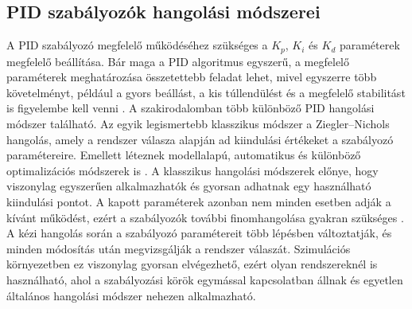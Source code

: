\documentclass[12pt,a4paper]{report}
\begin{document}
	\subsection{PID szabályozók hangolási módszerei}
	A PID szabályozó megfelelő működéséhez szükséges a $K_p$, $K_i$ és $K_d$ paraméterek megfelelő beállítása. Bár maga a PID algoritmus egyszerű, a megfelelő paraméterek meghatározása összetettebb feladat lehet, mivel egyszerre több követelményt, például a gyors beállást, a kis túllendülést és a megfelelő stabilitást is figyelembe kell venni \cite{ang2005,somefun2021}.
	\newline
	\newline
	A szakirodalomban több különböző PID hangolási módszer található. Az egyik legismertebb klasszikus módszer a Ziegler--Nichols hangolás, amely a rendszer válasza alapján ad kiindulási értékeket a szabályozó paramétereire. Emellett léteznek modellalapú, automatikus és különböző optimalizációs módszerek is \cite{somefun2021}.
	\newline
	\newline
	A klasszikus hangolási módszerek előnye, hogy viszonylag egyszerűen alkalmazhatók és gyorsan adhatnak egy használható kiindulási pontot. A kapott paraméterek azonban nem minden esetben adják a kívánt működést, ezért a szabályozók további finomhangolása gyakran szükséges \cite{ang2005,somefun2021}.
	\newline
	\newline
	A kézi hangolás során a szabályozó paramétereit több lépésben változtatják, és minden módosítás után megvizsgálják a rendszer válaszát. Szimulációs környezetben ez viszonylag gyorsan elvégezhető, ezért olyan rendszereknél is használható, ahol a szabályozási körök egymással kapcsolatban állnak és egyetlen általános hangolási módszer nehezen alkalmazható.
\end{document}
